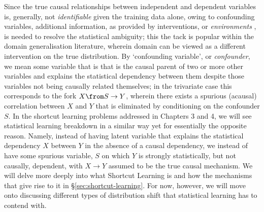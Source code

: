 Since the true causal relationships between independent and dependent variables is, generally, not
\emph{identifiable} given the training data alone, owing to confounding variables, additional
information, as provided by interventions, or \emph{environments} \citep{peters2016causal}, is
needed to resolve the statistical ambiguity; this  the tack is popular within the domain
generalisation literature, wherein domain can be viewed as a different intervention on the true
distribution.
%
By `confounding variable', or \emph{confounder}, we mean some variable that is that is the causal
parent of two or more other variables and explains the statistical dependency between them despite
those variables not being causally related themselves; in the trivariate case this corresponds to
the fork \(X \from S \to Y \), wherein there exists a spurious (acausal) correlation between \(X\)
and \(Y\) that is eliminated by conditioning on the confounder \(S\).
%
In the shortcut learning problems addressed in Chapters 3 and 4, we will see statistical learning
breakdown in a similar way yet for essentially the opposite reason.
%
Namely, instead of having latent variable that explains the statistical dependency \(X\) between
\(Y\) in the absence of a causal dependency, we instead of have some spurious variable, \(S\) on
which \(Y\) is strongly statistically, but not causally, dependent, with \(X \to Y \) assumed to be
the true causal mechanism.
%
We will delve more deeply into what Shortcut Learning is and how the mechanisms that give rise to
it in \S\ref{sec:shortcut-learning}.
%
For now, however, we will move onto discussing different types of distribution shift that
statistical learning has to contend with.



